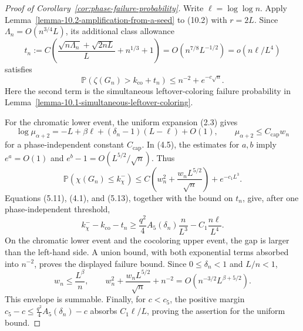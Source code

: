 \documentclass[a4paper,10pt,reqno]{amsart}
\numberwithin{equation}{section}
\theoremstyle{plain}
\theoremstyle{remark}
\begin{document}
\begin{proof}[Proof of Corollary~\ref{cor:phase-failure-probability}]
Write \(\ell=\log\log n\). Apply
Lemma~\ref{lemma-10.2-amplification-from-a-seed} to (10.2) with \(r=2L\).
Since \(\Lambda_n=O(n^{3/4}L)\), its additional class allowance
\[
 t_n:=C\left(
 \frac{\sqrt{n\Lambda_n}+\sqrt{2nL}}L+n^{1/3}+1
 \right)
 =O(n^{7/8}L^{-1/2})=o(n\ell/L^4)
\]
satisfies
\[
 \mathbb P(\zeta(G_n)>k_{\mathrm{co}}+t_n)
 \le n^{-2}+e^{-c\sqrt n}.
\]
Here the second term is the simultaneous leftover-coloring failure
probability in Lemma~\ref{lemma-10.1-simultaneous-leftover-coloring}.

For the chromatic lower event, the uniform expansion (2.3) gives
\[
 \log\mu_{\alpha+2}
 =-L+\beta\ell+(\delta_n-1)(L-\ell)+O(1),
 \qquad \mu_{\alpha+2}\le C_{\mathrm{cap}}w_n
\]
for a phase-independent constant \(C_{\mathrm{cap}}\). In (4.5), the
estimates for \(a,b\) imply \(e^a=O(1)\) and
\(e^b-1=O(L^{5/2}/\sqrt n)\). Thus
\[
 \mathbb P(\chi(G_n)\le k_\chi^-)
 \le C\left(w_n^2+\frac{w_nL^{5/2}}{\sqrt n}\right)+e^{-c_1L^3}.
\]
Equations (5.11), (4.1), and (5.13), together with the bound on \(t_n\),
give, after one phase-independent threshold,
\[
 k_\chi^- - k_{\mathrm{co}}-t_n
 \ge\frac{q^2}{4}A_5(\delta_n)\frac n{L^3}
       -C_1\frac{n\ell}{L^4}.
\]
On the chromatic lower event and the cocoloring upper event, the gap is
larger than the left-hand side. A union bound, with both exponential terms
absorbed into \(n^{-2}\), proves the displayed failure bound.
Since \(0\le\delta_n<1\) and \(L/n<1\),
\[
 w_n\le\frac{L^\beta}{n},\qquad
 w_n^2+\frac{w_nL^{5/2}}{\sqrt n}+n^{-2}
 =O\!\left(n^{-3/2}L^{\beta+5/2}\right).
\]
This envelope is summable. Finally, for \(c<c_5\), the positive margin
\(c_5-c\le\frac{q^2}{4}A_5(\delta_n)-c\) absorbs \(C_1\ell/L\), proving the
assertion for the uniform bound.
\end{proof}
\end{document}
